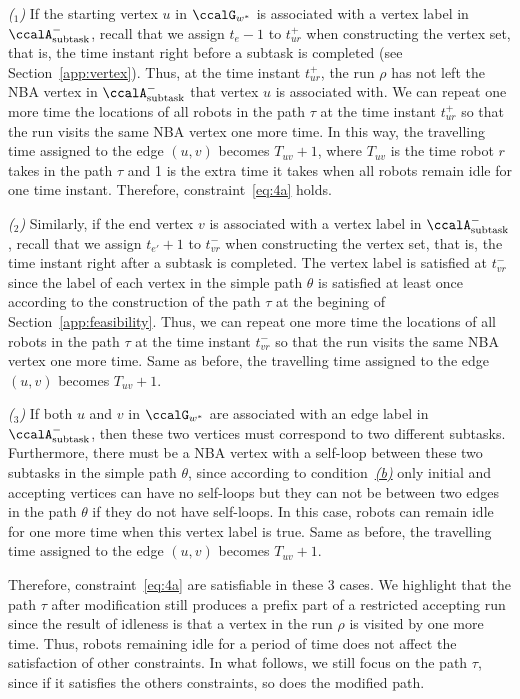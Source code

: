 \documentclass[Afour,sageh,times]{sagej}
\newcounter{mycounter}
\newcommand{\auto}[1]{\ccalA_{\textup{#1}}}
\begin{document}
{{{\it ($_1$)} If the starting vertex $u$ in $\ccalG_{w^*}$ is associated with a vertex label in $\auto{subtask}^-$, recall that we assign $t_e-1$ to $t_{ur}^+$ when constructing the vertex set, that is, the time instant right before a subtask is completed (see Section~\ref{app:vertex}). Thus, at the time instant $t_{ur}^+$, the run $\rho$ has not left the NBA vertex in $\auto{subtask}^-$ that vertex $u$ is associated with. We can repeat one more time the locations of all robots in the path $\tau$ at the time instant $t_{ur}^+$  so that the run visits the same NBA vertex  one more time. In this way, the travelling time assigned to  the edge $(u,v)$ becomes $T_{uv}+1$, where $T_{uv}$ is the time robot $r$ takes in the path $\tau$ and 1 is the extra time it takes when all robots remain idle for one time instant. Therefore, constraint~\eqref{eq:4a} holds.

{\it ($_2$)} Similarly, if the end vertex $v$ is associated with a vertex label in $\auto{subtask}^-$, recall that we assign $t_{e'}+1$ to $t_{vr}^-$ when constructing the vertex set, that is, the time instant right after a subtask is completed. The vertex label is satisfied at $t_{vr}^-$ since the  label of each vertex in the simple path $\theta$ is satisfied at least once according to the construction of the path $\tau$ at the begining of Section~\ref{app:feasibility}. Thus, we can repeat one more  time the locations of all robots in the path $\tau$ at the time instant $t_{vr}^-$  so that the run visits the same NBA vertex  one  more time. Same as before, the travelling time assigned to  the edge $(u,v)$ becomes $T_{uv}+1$.

{\it ($_3$)} If both $u$ and $v$ in $\ccalG_{w^*}$ are associated with an edge label in $\auto{subtask}^-$, then these two vertices must correspond to two different subtasks. Furthermore, there must be a NBA vertex with a  self-loop between these two subtasks in the simple path $\theta$, since according to condition~\hyperref[cond:b]{\it (b)} only initial and accepting vertices can have no self-loops but they can not be between two edges in the path $\theta$ if they do not have self-loops. In this case, robots can remain idle for one more time  when this vertex label is true. Same as before, the travelling time assigned to  the edge $(u,v)$ becomes $T_{uv}+1$.


Therefore, constraint~\eqref{eq:4a} are satisfiable in these 3 cases. We highlight that the path $\tau$ after modification still produces a prefix part of a restricted accepting run since the result of idleness is  that a vertex in the run $\rho$ is visited by one more time.  Thus, robots remaining idle for a period of time does not affect the satisfaction of other constraints. In what follows, we still focus on the path $\tau$, since if it satisfies the others constraints, so does the modified path.

}}
\end{document}
